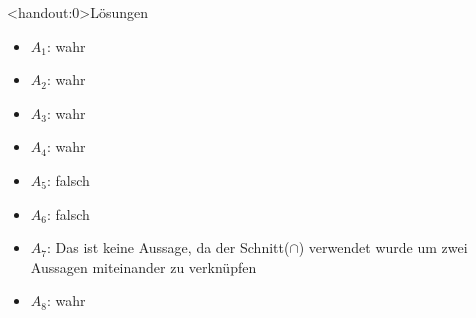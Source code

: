 {
\begin{frame}<handout:0>{Lösungen}
  \begin{itemize}[<+- | alert@+>]
        \item
            $A_1$: wahr
        \item
            $A_2$: wahr
        \item
            $A_3$: wahr
        \item
            $A_4$: wahr
        \item
            $A_5$: falsch
       	\item
       		$A_6$: falsch
        \item
            $A_7$: Das ist keine Aussage, da der Schnitt($\cap$) verwendet wurde um zwei Aussagen miteinander zu verknüpfen
       	\item
       		$A_8$: wahr
    \end{itemize}
\end{frame}
}


